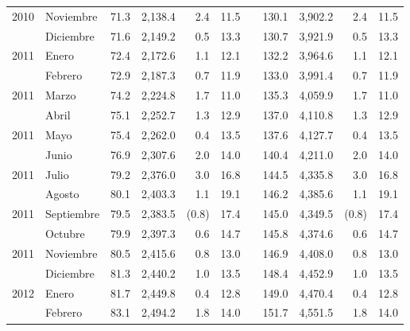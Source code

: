 \begin{center}
\begin{longtable}{llrrrrrrrrr}
		\multicolumn{1}{l}{	2010	}&	Noviembre	&	 71.3 	&	 2,138.4 	&	 2.4 	&	 11.5 	&  &	 130.1 	&	 3,902.2 	&	 2.4 	&	 11.5 	\\
		\rowcolor{color1!5!white}\multicolumn{1}{l}{	2010	}&	Diciembre	&	 71.6 	&	 2,149.2 	&	 0.5 	&	 13.3 	&  &	 130.7 	&	 3,921.9 	&	 0.5 	&	 13.3 	\\
		\multicolumn{1}{l}{	2011	}&	Enero	&	 72.4 	&	 2,172.6 	&	 1.1 	&	 12.1 	&  &	 132.2 	&	 3,964.6 	&	 1.1 	&	 12.1 	\\
		\rowcolor{color1!5!white}\multicolumn{1}{l}{	2011	}&	Febrero	&	 72.9 	&	 2,187.3 	&	 0.7 	&	 11.9 	&  &	 133.0 	&	 3,991.4 	&	 0.7 	&	 11.9 	\\
		\multicolumn{1}{l}{	2011	}&	Marzo	&	 74.2 	&	 2,224.8 	&	 1.7 	&	 11.0 	&  &	 135.3 	&	 4,059.9 	&	 1.7 	&	 11.0 	\\
		\rowcolor{color1!5!white}\multicolumn{1}{l}{	2011	}&	Abril	&	 75.1 	&	 2,252.7 	&	 1.3 	&	 12.9 	&  &	 137.0 	&	 4,110.8 	&	 1.3 	&	 12.9 	\\
		\multicolumn{1}{l}{	2011	}&	Mayo	&	 75.4 	&	 2,262.0 	&	 0.4 	&	 13.5 	&  &	 137.6 	&	 4,127.7 	&	 0.4 	&	 13.5 	\\
		\rowcolor{color1!5!white}\multicolumn{1}{l}{	2011	}&	Junio	&	 76.9 	&	 2,307.6 	&	 2.0 	&	 14.0 	&  &	 140.4 	&	 4,211.0 	&	 2.0 	&	 14.0 	\\
		\multicolumn{1}{l}{	2011	}&	Julio	&	 79.2 	&	 2,376.0 	&	 3.0 	&	 16.8 	&  &	 144.5 	&	 4,335.8 	&	 3.0 	&	 16.8 	\\
		\rowcolor{color1!5!white}\multicolumn{1}{l}{	2011	}&	Agosto	&	 80.1 	&	 2,403.3 	&	 1.1 	&	 19.1 	&  &	 146.2 	&	 4,385.6 	&	 1.1 	&	 19.1 	\\
		\multicolumn{1}{l}{	2011	}&	Septiembre	&	 79.5 	&	 2,383.5 	&	 (0.8)	&	 17.4 	&  &	 145.0 	&	 4,349.5 	&	 (0.8)	&	 17.4 	\\
		\rowcolor{color1!5!white}\multicolumn{1}{l}{	2011	}&	Octubre	&	 79.9 	&	 2,397.3 	&	 0.6 	&	 14.7 	&  &	 145.8 	&	 4,374.6 	&	 0.6 	&	 14.7 	\\
		\multicolumn{1}{l}{	2011	}&	Noviembre	&	 80.5 	&	 2,415.6 	&	 0.8 	&	 13.0 	&  &	 146.9 	&	 4,408.0 	&	 0.8 	&	 13.0 	\\
		\rowcolor{color1!5!white}\multicolumn{1}{l}{	2011	}&	Diciembre	&	 81.3 	&	 2,440.2 	&	 1.0 	&	 13.5 	&  &	 148.4 	&	 4,452.9 	&	 1.0 	&	 13.5 	\\
		\multicolumn{1}{l}{	2012	}&	Enero	&	 81.7 	&	 2,449.8 	&	 0.4 	&	 12.8 	&  &	 149.0 	&	 4,470.4 	&	 0.4 	&	 12.8 	\\
		\rowcolor{color1!5!white}\multicolumn{1}{l}{	2012	}&	Febrero	&	 83.1 	&	 2,494.2 	&	 1.8 	&	 14.0 	&  &	 151.7 	&	 4,551.5 	&	 1.8 	&	 14.0 	\\

\end{longtable}
\end{center}
